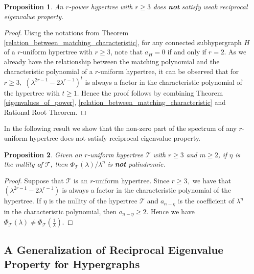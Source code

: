 \documentclass[10pt,a4paper]{article}
\newtheorem{proposition}{Proposition}[section]
\begin{document}
	
	
	\begin{proposition}
		An $r$-power hypertree with $r\geq 3$ does {\bf not} satisfy weak reciprocal eigenvalue property.
	\end{proposition}
	\begin{proof}
		Uisng the notations from Theorem \ref{relation_between_matching_characteristic},  for any connected subhypergraph $H$ of a $r$-uniform hypertree with $r \geq 3$, note that 
		$a_H=0$ if and only if $r=2$.
		As we already have the relationship between the matching polynomial and the characteristic polynomial of a $r$-uniform hypertree, it can be observed that for $r \geq 3,$ $(\lambda^{2r-1}-2\lambda^{r-1})^{t}$ is always a factor in the characteristic polynomial of the hypertree with $t \geq 1$. Hence the proof follows by combining Theorem \ref{eigenvalues_of_power}, \ref{relation_between_matching_characteristic} and Rational Root Theorem.
	\end{proof}
	
	In the following result we show that the non-zero part of the spectrum of any $r$-uniform hypertree does not satisfy reciprocal eigenvalue property.
	
	\begin{proposition}
		Given an $r$-uniform hypertree $\mathcal{T}$ with $r \geq 3$ and $m \geq 2$, if $\eta$ is the nullity of $\mathcal{T}$, then $\Phi_{\mathcal{T}}(\lambda) / \lambda^{\eta}$ is {\bf not} palindromic.
	\end{proposition}
	\begin{proof}
		Suppose that $\mathcal{T}$ is an $r$-uniform hypertree.
		Since $r \geq 3,$ we have that $(\lambda^{2r-1}-2\lambda^{r-1})$ is always a factor in the characteristic polynomial of the hypertree. 
		If $\eta$ is the nullity of the hypertree $\mathcal{T}$ and $a_{n-\eta}$ is the coefficient of $\lambda^{\eta}$ in the characteristic polynomial, then $a_{n-\eta} \geq 2$. Hence we have $\Phi_{\mathcal{T}}(\lambda) \neq \Phi_{\mathcal{T}}(\frac{1}{\lambda})$.
	\end{proof}
	
	
	
	
	
	\subsection{A Generalization of Reciprocal Eigenvalue Property for Hypergraphs}
	
\end{document}
